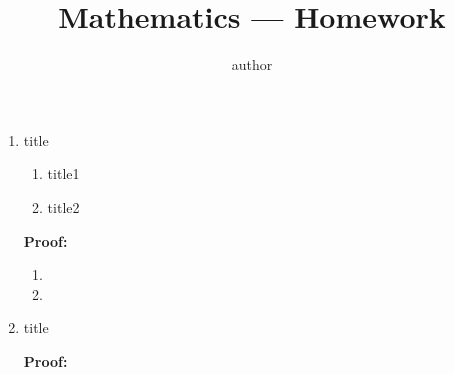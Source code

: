 \documentclass[12pt]{article}
\title{Mathematics  — Homework }
\author{author}
\date{}
\newcommand{\proof}{\par \textbf{Proof:}\par }
\begin{document}
	\maketitle
 
\begin{enumerate}
\item title
	\begin{enumerate}
	\item title1 
	\item title2
	\end{enumerate}
	\proof 
	\begin{enumerate}
	\item 
	\item  
	\end{enumerate}

\item title
	\proof

	
\end{enumerate}
\end{document}
